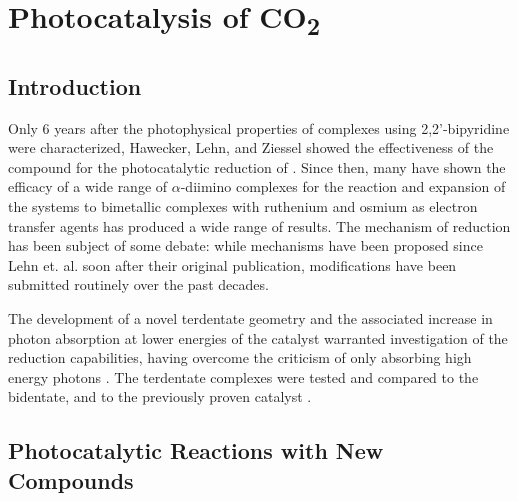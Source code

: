 \chapter{Photocatalysis of \texorpdfstring{CO\textsubscript{2}}{CO2}}\label{chap.co2}

\section{Introduction}

Only 6 years after the photophysical properties of  complexes using 2,2'-bipyridine were characterized\autocite{morse1976}, Hawecker, Lehn, and Ziessel showed the effectiveness of the compound for the photocatalytic reduction of \autocite{hawecker1983}. Since then, many have shown the efficacy of a wide range of $\alpha$-diimino complexes for the reaction\autocite{hawecker1986, kurz2006, portenkirchner2014} and expansion of the systems to bimetallic complexes with ruthenium and osmium as electron transfer agents has produced a wide range of results\autocite{rossenaar1996, takeda2008, tamaki2013}. The mechanism of reduction has been subject of some debate: while mechanisms have been proposed since Lehn et. al. soon after their original publication\autocite{hawecker1986}, modifications have been submitted routinely over the past decades\autocite{hayashi2003, morris2009, takeda2008, grills2010, agarwal2011, agarwal2012a, agarwal2012b, keith2013}. 

The development of a novel terdentate geometry and the associated increase in photon absorption at lower energies of the catalyst warranted investigation of the  reduction capabilities, having overcome the criticism of only absorbing high energy photons \autocite{kutal1985}. The terdentate complexes were tested and compared to the bidentate, and to the previously proven catalyst . 

\section{Photocatalytic Reactions with New Compounds}

